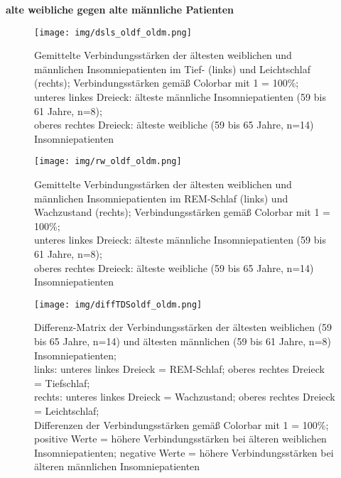 \textbf{alte weibliche gegen alte männliche Patienten}



\begin{figure}[H]
	\centering
	\texttt{[image: img/dsls\_oldf\_oldm.png]}
	\caption[Verbindungsstärken der ältesten weiblichen und männlichen Insomniepatienten im Tief- und Leichtschlaf]{Gemittelte Verbindungsstärken der ältesten weiblichen und männlichen Insomniepatienten im Tief- (links) und Leichtschlaf (rechts); Verbindungsstärken gemäß Colorbar mit 1 = 100\%;\\unteres linkes Dreieck: älteste männliche Insomniepatienten (59 bis 61 Jahre, n=8);\\oberes rechtes Dreieck: älteste weibliche (59 bis 65 Jahre, n=14) Insomniepatienten}
	\label{fig:dsls_oldf_oldm}
\end{figure}

\begin{figure}[H]
	\centering
	\texttt{[image: img/rw\_oldf\_oldm.png]}
	\caption[Verbindungsstärken der ältesten weiblichen und männlichen Insomniepatienten im REM-Schlaf und Wachzustand]{Gemittelte Verbindungsstärken der ältesten weiblichen und männlichen Insomniepatienten im REM-Schlaf (links) und Wachzustand (rechts); Verbindungsstärken gemäß Colorbar mit 1 = 100\%;\\unteres linkes Dreieck: älteste männliche Insomniepatienten (59 bis 61 Jahre, n=8);\\oberes rechtes Dreieck: älteste weibliche (59 bis 65 Jahre, n=14) Insomniepatienten}
	\label{fig:rw_oldf_oldm}
\end{figure}

\begin{figure}[H]
	\centering
	\texttt{[image: img/diffTDSoldf\_oldm.png]}
	\caption[Differenz-Matrix der Verbindungsstärken der ältesten weiblichen und männlichen Insomniepatienten]{Differenz-Matrix der Verbindungsstärken der ältesten weiblichen (59 bis 65 Jahre, n=14) und ältesten männlichen (59 bis 61 Jahre, n=8) Insomniepatienten;\\links: unteres linkes Dreieck = REM-Schlaf; oberes rechtes Dreieck = Tiefschlaf;\\rechts: unteres linkes Dreieck = Wachzustand; oberes rechtes Dreieck = Leichtschlaf;\\Differenzen der Verbindungsstärken gemäß Colorbar mit 1 = 100\%;\\positive Werte = höhere Verbindungsstärken bei älteren weiblichen Insomniepatienten; negative Werte = höhere Verbindungsstärken bei älteren männlichen Insomniepatienten}
	\label{fig:diffTDSoldf_oldm}
\end{figure}





